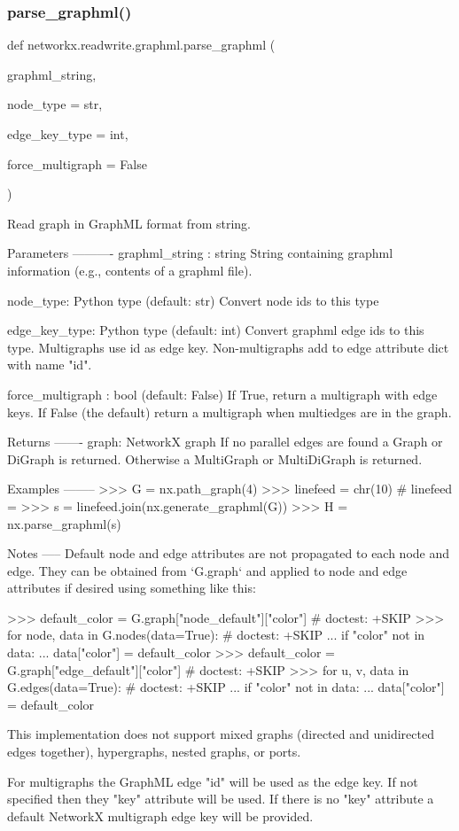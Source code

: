 \subsubsection{\texorpdfstring{parse\+\_\+graphml()}{parse\_graphml()}}
{\footnotesize\ttfamily def networkx.\+readwrite.\+graphml.\+parse\+\_\+graphml (\begin{DoxyParamCaption}\item[{}]{graphml\+\_\+string,  }\item[{}]{node\+\_\+type = {\ttfamily str},  }\item[{}]{edge\+\_\+key\+\_\+type = {\ttfamily int},  }\item[{}]{force\+\_\+multigraph = {\ttfamily False} }\end{DoxyParamCaption})}

\begin{DoxyVerb}Read graph in GraphML format from string.

Parameters
----------
graphml_string : string
   String containing graphml information
   (e.g., contents of a graphml file).

node_type: Python type (default: str)
   Convert node ids to this type

edge_key_type: Python type (default: int)
   Convert graphml edge ids to this type. Multigraphs use id as edge key.
   Non-multigraphs add to edge attribute dict with name "id".

force_multigraph : bool (default: False)
   If True, return a multigraph with edge keys. If False (the default)
   return a multigraph when multiedges are in the graph.


Returns
-------
graph: NetworkX graph
    If no parallel edges are found a Graph or DiGraph is returned.
    Otherwise a MultiGraph or MultiDiGraph is returned.

Examples
--------
>>> G = nx.path_graph(4)
>>> linefeed = chr(10)  # linefeed = \n
>>> s = linefeed.join(nx.generate_graphml(G))
>>> H = nx.parse_graphml(s)

Notes
-----
Default node and edge attributes are not propagated to each node and edge.
They can be obtained from `G.graph` and applied to node and edge attributes
if desired using something like this:

>>> default_color = G.graph["node_default"]["color"]  # doctest: +SKIP
>>> for node, data in G.nodes(data=True):  # doctest: +SKIP
...     if "color" not in data:
...         data["color"] = default_color
>>> default_color = G.graph["edge_default"]["color"]  # doctest: +SKIP
>>> for u, v, data in G.edges(data=True):  # doctest: +SKIP
...     if "color" not in data:
...         data["color"] = default_color

This implementation does not support mixed graphs (directed and unidirected
edges together), hypergraphs, nested graphs, or ports.

For multigraphs the GraphML edge "id" will be used as the edge
key.  If not specified then they "key" attribute will be used.  If
there is no "key" attribute a default NetworkX multigraph edge key
will be provided.\end{DoxyVerb}
